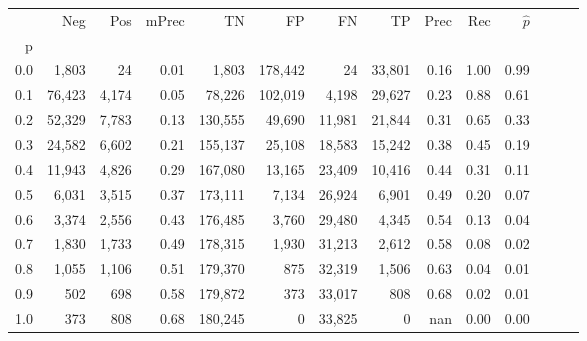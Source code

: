 \begin{tabular}{rrrrrrrrrrrrrr}
\toprule
{} &     Neg &    Pos & mPrec &       TN &       FP &      FN &      TP &  Prec &   Rec & $\hat{p}$ \\
p   &         &        &       &          &          &         &         &       &       &           \\
\midrule
0.0 &   1,803 &     24 &  0.01 &    1,803 &  178,442 &      24 &  33,801 &  0.16 &  1.00 &      0.99 \\
0.1 &  76,423 &  4,174 &  0.05 &   78,226 &  102,019 &   4,198 &  29,627 &  0.23 &  0.88 &      0.61 \\
0.2 &  52,329 &  7,783 &  0.13 &  130,555 &   49,690 &  11,981 &  21,844 &  0.31 &  0.65 &      0.33 \\
0.3 &  24,582 &  6,602 &  0.21 &  155,137 &   25,108 &  18,583 &  15,242 &  0.38 &  0.45 &      0.19 \\
0.4 &  11,943 &  4,826 &  0.29 &  167,080 &   13,165 &  23,409 &  10,416 &  0.44 &  0.31 &      0.11 \\
0.5 &   6,031 &  3,515 &  0.37 &  173,111 &    7,134 &  26,924 &   6,901 &  0.49 &  0.20 &      0.07 \\
0.6 &   3,374 &  2,556 &  0.43 &  176,485 &    3,760 &  29,480 &   4,345 &  0.54 &  0.13 &      0.04 \\
0.7 &   1,830 &  1,733 &  0.49 &  178,315 &    1,930 &  31,213 &   2,612 &  0.58 &  0.08 &      0.02 \\
0.8 &   1,055 &  1,106 &  0.51 &  179,370 &      875 &  32,319 &   1,506 &  0.63 &  0.04 &      0.01 \\
0.9 &     502 &    698 &  0.58 &  179,872 &      373 &  33,017 &     808 &  0.68 &  0.02 &      0.01 \\
1.0 &     373 &    808 &  0.68 &  180,245 &        0 &  33,825 &       0 &   nan &  0.00 &      0.00 \\
\bottomrule
\end{tabular}
